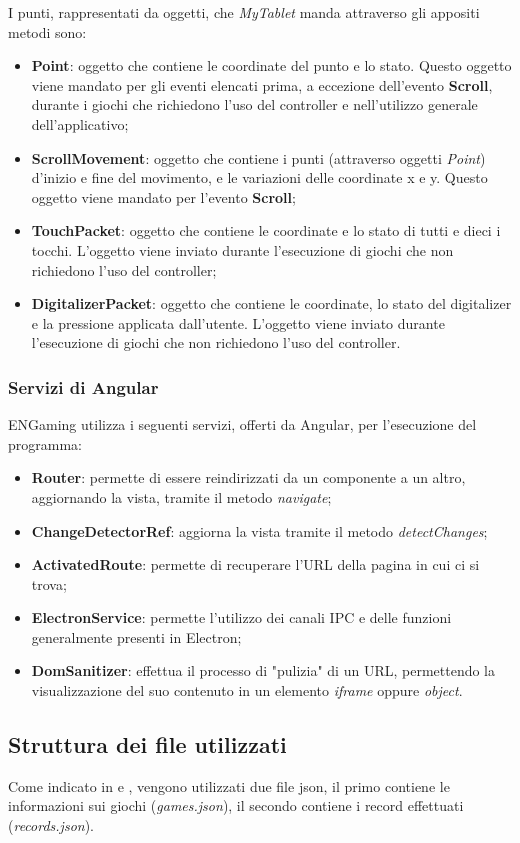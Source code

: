 I punti, rappresentati da oggetti, che \emph{MyTablet} manda attraverso gli appositi metodi sono:
\begin{itemize}
    \item \textbf{Point}: oggetto che contiene le coordinate del punto e lo stato. Questo oggetto viene mandato per gli eventi elencati prima, a eccezione dell'evento \textbf{Scroll}, durante i giochi che richiedono l'uso del controller e nell'utilizzo generale dell'applicativo;
    \item \textbf{ScrollMovement}: oggetto che contiene i punti (attraverso oggetti \emph{Point}) d'inizio e fine del movimento, e le variazioni delle coordinate x e y. Questo oggetto viene mandato per l'evento \textbf{Scroll};
    \item \textbf{TouchPacket}: oggetto che contiene le coordinate e lo stato di tutti e dieci i tocchi. L'oggetto viene inviato durante l'esecuzione di giochi che non richiedono l'uso del controller;
    \item \textbf{DigitalizerPacket}: oggetto che contiene le coordinate, lo stato del digitalizer e la pressione applicata dall'utente. L'oggetto viene inviato durante l'esecuzione di giochi che non richiedono l'uso del controller.
\end{itemize}
\subsubsection{Servizi di Angular}
\label{subsec:angularServices}
ENGaming utilizza i seguenti servizi, offerti da Angular, per l'esecuzione del programma:
\begin{itemize}
    \item \textbf{Router}: permette di essere reindirizzati da un componente a un altro, aggiornando la vista, tramite il metodo \emph{navigate};
    \item \textbf{ChangeDetectorRef}: aggiorna la vista tramite il metodo \emph{detectChanges};
    \item \textbf{ActivatedRoute}: permette di recuperare l'URL della pagina in cui ci si trova;
    \item \textbf{ElectronService}: permette l'utilizzo dei canali IPC e delle funzioni generalmente presenti in Electron;
    \item \textbf{DomSanitizer}: effettua il processo di "pulizia" di un URL, permettendo la visualizzazione del suo contenuto in un elemento \emph{iframe} oppure \emph{object}.
\end{itemize}
\subsection{Struttura dei file utilizzati}
\label{subsec:strutturaFile}
Come indicato in  e , vengono utilizzati due file json, il primo contiene le informazioni sui giochi (\emph{games.json}), il secondo contiene i record effettuati (\emph{records.json}).
